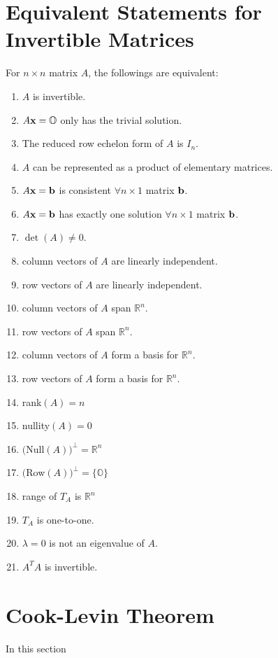 

    \section{Equivalent Statements for Invertible Matrices}\label{equiv_invert}
    		For $n \times n$ matrix $A$, the followings are equivalent:
        \begin{enumerate}
        	\item $A$ is invertible.
        	\item $A\bf{x}=\mathbb{O}$ only has the trivial solution.
        	\item The reduced row echelon form of $A$ is $I_n$.
        	\item $A$ can be represented as a product of elementary matrices.
        	\item $A\bf{x}=\bf{b}$ is consistent $\forall n \times 1$ matrix $\bf{b}$.
        	\item $A\bf{x}=\bf{b}$ has exactly one solution $\forall n \times 1$ matrix $\bf{b}$.
        	\item $\det(A)\ne0$.
        	\item column vectors of $A$ are linearly independent.
        	\item row vectors of $A$ are linearly independent.
        	\item column vectors of $A$ span $\mathbb{R}^n$.
        	\item row vectors of $A$ span $\mathbb{R}^n$.
        	\item column vectors of $A$ form a basis for $\mathbb{R}^n$.
        	\item row vectors of $A$ form a basis for $\mathbb{R}^n$.
        	\item rank$(A)=n$
        	\item nullity$(A)=0$
        	\item $($Null$(A))^\perp=\mathbb{R}^n$
        	\item $($Row$(A))^\perp=\{\mathbb{O}\}$
        	\item range of $T_A$ is $\mathbb{R}^n$
        	\item $T_A$ is one-to-one.
        	\item $\lambda=0$ is not an eigenvalue of $A$.
        	\item $A^TA$ is invertible.
        \end{enumerate}
        
    \section{Cook-Levin Theorem}
        In this section
    
